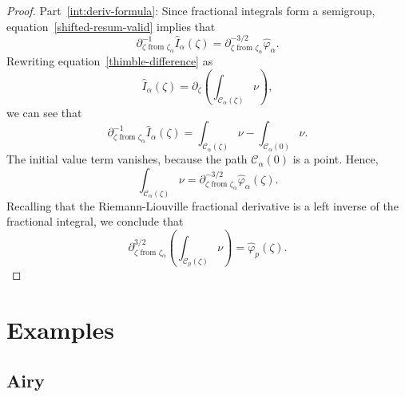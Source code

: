 \documentclass{article}
\theoremstyle{definition}
\begin{document}
\begin{proof}
Part~\eqref{int:deriv-formula}: Since fractional integrals form a semigroup, equation~\eqref{shifted-resum-valid} implies that
\[ \partial^{-1}_{\zeta \text{ from } \zeta_\alpha} \hat{I}_\alpha(\zeta) = \partial^{-3/2}_{\zeta \text{ from } \zeta_\alpha} \hat{\varphi}_\alpha. \]
Rewriting equation~\eqref{thimble-difference} as
\[ \hat{I}_\alpha(\zeta) = \partial_\zeta \left( \int_{\mathcal{C}_\alpha(\zeta)} \nu \right), \]
we can see that
\[ \partial^{-1}_{\zeta \text{ from } \zeta_\alpha} \hat{I}_\alpha(\zeta) = \int_{\mathcal{C}_\alpha(\zeta)} \nu - \int_{\mathcal{C}_\alpha(0)} \nu. \]
The initial value term vanishes, because the path $\mathcal{C}_\alpha(0)$ is a point. Hence,
\[ \int_{\mathcal{C}_\alpha(\zeta)} \nu = \partial^{-3/2}_{\zeta \text{ from } \zeta_\alpha} \hat{\varphi}_\alpha(\zeta). \]
Recalling that the Riemann-Liouville fractional derivative is a left inverse of the fractional integral, we conclude that
\[ \partial^{3/2}_{\zeta \text{ from } \zeta_\alpha} \left( \int_{\mathcal{C}_p(\zeta)} \nu \right) = \hat{\varphi}_p(\zeta). \]
\end{proof}


\section{Examples}

\subsection{Airy}
\end{document}
